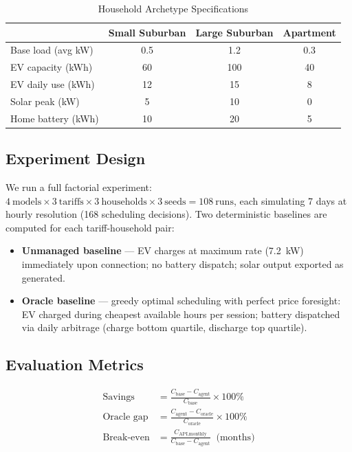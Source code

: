 \documentclass[conference]{IEEEtran}
\begin{document}
\begin{table}[h]
\centering
\caption{Household Archetype Specifications}
\label{tab:archetypes}
\begin{tabular}{lccc}
\toprule
 & Small Suburban & Large Suburban & Apartment \\
\midrule
Base load (avg kW)   & 0.5  & 1.2  & 0.3  \\
EV capacity (kWh)    & 60   & 100  & 40   \\
EV daily use (kWh)   & 12   & 15   & 8    \\
Solar peak (kW)      & 5    & 10   & 0    \\
Home battery (kWh)   & 10   & 20   & 5    \\
\bottomrule
\end{tabular}
\end{table}

\subsection{Experiment Design}

We run a full factorial experiment:
$4~\text{models} \times 3~\text{tariffs} \times 3~\text{households}
\times 3~\text{seeds} = 108~\text{runs}$,
each simulating 7 days at hourly resolution (168 scheduling decisions).
Two deterministic baselines are computed for each tariff-household pair:

\begin{itemize}
  \item \textbf{Unmanaged baseline} --- EV charges at maximum rate (7.2~kW)
    immediately upon connection; no battery dispatch; solar output exported
    as generated.
  \item \textbf{Oracle baseline} --- greedy optimal scheduling with perfect
    price foresight: EV charged during cheapest available hours per session;
    battery dispatched via daily arbitrage (charge bottom quartile,
    discharge top quartile).
\end{itemize}

\subsection{Evaluation Metrics}

\begin{align}
\text{Savings} &= \frac{C_{\text{base}} - C_{\text{agent}}}{C_{\text{base}}} \times 100\% \\
\text{Oracle gap} &= \frac{C_{\text{agent}} - C_{\text{oracle}}}{C_{\text{oracle}}} \times 100\% \\
\text{Break-even} &= \frac{C_{\text{API,monthly}}}{C_{\text{base}} - C_{\text{agent}}} \;\; \text{(months)}
\end{align}
\end{document}
